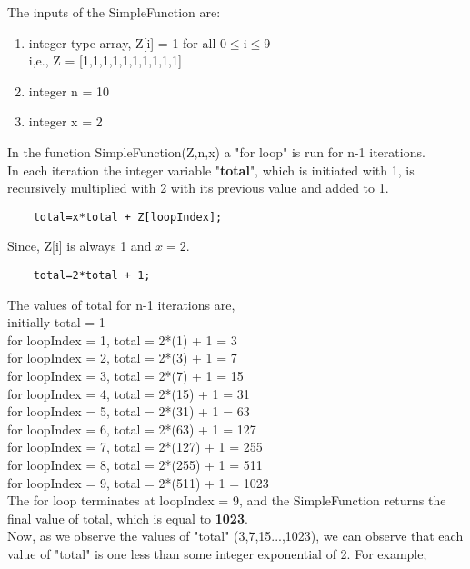 \documentclass[journal,12pt,twocolumn]{IEEEtran}
\begin{document}
The inputs of the SimpleFunction are:
\begin{enumerate}
    \item integer type array, Z[i] = 1 for all 0$\le$i$\le$9 \\
    i,e., Z = [1,1,1,1,1,1,1,1,1,1] 
    \item integer n = 10
    \item integer x = 2
\end{enumerate}

In the function SimpleFunction(Z,n,x) a "for loop" is run for n-1 iterations. \\
In each iteration the integer variable  "\textbf{total}", which is initiated with 1, is recursively multiplied with 2 with its previous value and added to 1.\\
\begin{lstlisting}
    total=x*total + Z[loopIndex];
\end{lstlisting}
Since, Z[i] is always 1 and $x = 2$.\\
\begin{lstlisting}
    total=2*total + 1;
\end{lstlisting}

The values of total for n-1 iterations are,\\
initially total = 1\\
for loopIndex = 1, total = 2*(1) + 1 = 3\\
for loopIndex = 2, total = 2*(3) + 1 = 7\\
for loopIndex = 3, total = 2*(7) + 1 = 15\\
for loopIndex = 4, total = 2*(15) + 1 = 31\\
for loopIndex = 5, total = 2*(31) + 1 = 63\\
for loopIndex = 6, total = 2*(63) + 1 = 127\\
for loopIndex = 7, total = 2*(127) + 1 = 255\\
for loopIndex = 8, total = 2*(255) + 1 = 511\\
for loopIndex = 9, total = 2*(511) + 1 = 1023\\

The for loop terminates at loopIndex = 9, and the SimpleFunction returns the final value of total, which is equal to \textbf{1023}.\\

Now, as we observe the values of "total" (3,7,15...,1023), we can observe that each value of "total" is one less than some integer exponential of 2. For example; \\ 
\end{document}
